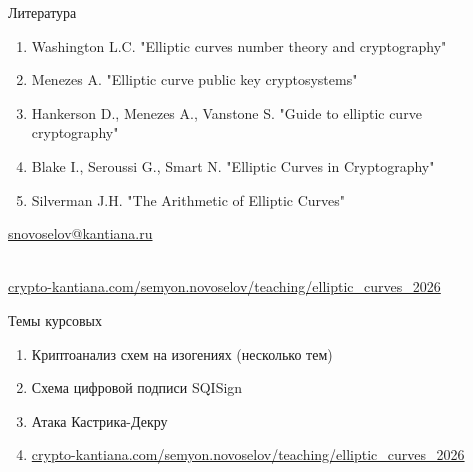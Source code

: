 \documentclass{beamer}
\begin{document}
\begin{frame}{Литература}
\begin{enumerate}
    \item Washington L.C. "Elliptic curves number theory and cryptography"%
    \item Menezes A. "Elliptic curve public key cryptosystems"
    \item Hankerson D., Menezes A., Vanstone S. "Guide to elliptic curve cryptography"
    \item Blake I., Seroussi G., Smart N. "Elliptic Curves in Cryptography"
    \item Silverman J.H. "The Arithmetic of Elliptic Curves"%
\end{enumerate}


\begin{center}
    \begin{tcolorbox}[enhanced,hbox,colback=block-green-color-bg,colframe=subsection-color!120,title=Контакты,center title]
        \begin{varwidth}{\textwidth}
            \begin{center}
                \href{mailto:snovoselov@kantiana.ru}{snovoselov@kantiana.ru}
            \end{center}
        \end{varwidth}
    \end{tcolorbox}	
\end{center}

\\
{\footnotesize
    \href{https://crypto-kantiana.com/semyon.novoselov/teaching/elliptic_curves_2026}{crypto-kantiana.com/semyon.novoselov/teaching/elliptic\_curves\_2026}
}
\end{frame}

\begin{frame}{Темы курсовых}
	\begin{enumerate}
		\item Криптоанализ схем на изогениях (несколько тем)
		\item Схема цифровой подписи SQISign
		\item Атака Кастрика-Декру
		\item {\footnotesize\href{https://crypto-kantiana.com/semyon.novoselov/teaching/elliptic_curves_2026\#topics}{crypto-kantiana.com/semyon.novoselov/teaching/elliptic\_curves\_2026}}
	\end{enumerate}
\end{frame}
\end{document}
